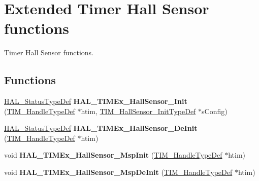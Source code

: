 \hypertarget{group___t_i_m_ex___exported___functions___group1}{}\section{Extended Timer Hall Sensor functions}
\label{group___t_i_m_ex___exported___functions___group1}


Timer Hall Sensor functions.  


\subsection*{Functions}
\begin{DoxyCompactItemize}
\item 
\mbox{\label{group___t_i_m_ex___exported___functions___group1_ga9edc6a00a673eb7c07b0c3cf86a95169}} 
\hyperlink{stm32f4xx__hal__def_8h_a63c0679d1cb8b8c684fbb0632743478f}{H\+A\+L\+\_\+\+Status\+Type\+Def} {\bfseries H\+A\+L\+\_\+\+T\+I\+M\+Ex\+\_\+\+Hall\+Sensor\+\_\+\+Init} (\hyperlink{struct_t_i_m___handle_type_def}{T\+I\+M\+\_\+\+Handle\+Type\+Def} $\ast$htim, \hyperlink{struct_t_i_m___hall_sensor___init_type_def}{T\+I\+M\+\_\+\+Hall\+Sensor\+\_\+\+Init\+Type\+Def} $\ast$s\+Config)
\item 
\mbox{\label{group___t_i_m_ex___exported___functions___group1_ga61f3c18eb8fe53b65b55ec855072631d}} 
\hyperlink{stm32f4xx__hal__def_8h_a63c0679d1cb8b8c684fbb0632743478f}{H\+A\+L\+\_\+\+Status\+Type\+Def} {\bfseries H\+A\+L\+\_\+\+T\+I\+M\+Ex\+\_\+\+Hall\+Sensor\+\_\+\+De\+Init} (\hyperlink{struct_t_i_m___handle_type_def}{T\+I\+M\+\_\+\+Handle\+Type\+Def} $\ast$htim)
\item 
\mbox{\label{group___t_i_m_ex___exported___functions___group1_ga88d9e7c4bc86e1a1190fda06e04552ea}} 
void {\bfseries H\+A\+L\+\_\+\+T\+I\+M\+Ex\+\_\+\+Hall\+Sensor\+\_\+\+Msp\+Init} (\hyperlink{struct_t_i_m___handle_type_def}{T\+I\+M\+\_\+\+Handle\+Type\+Def} $\ast$htim)
\item 
\mbox{\label{group___t_i_m_ex___exported___functions___group1_gac19734439bdfa549b7fb5d85f3c0720d}} 
void {\bfseries H\+A\+L\+\_\+\+T\+I\+M\+Ex\+\_\+\+Hall\+Sensor\+\_\+\+Msp\+De\+Init} (\hyperlink{struct_t_i_m___handle_type_def}{T\+I\+M\+\_\+\+Handle\+Type\+Def} $\ast$htim)

\end{DoxyCompactItemize}
